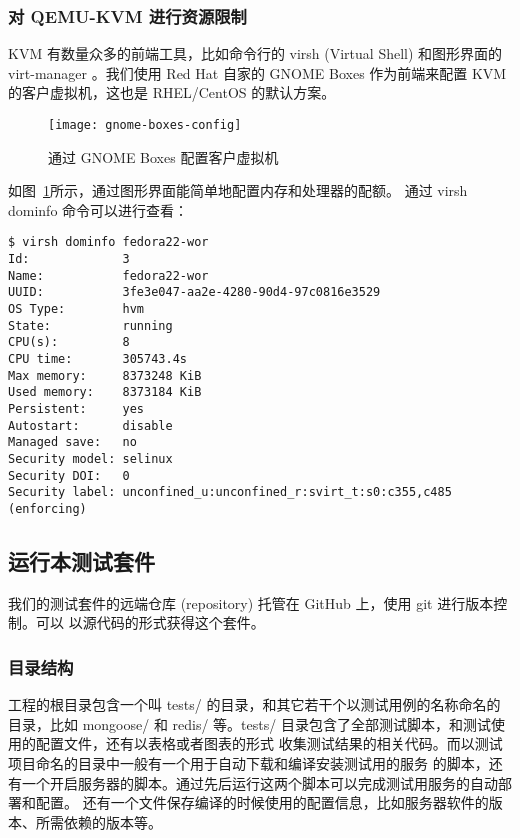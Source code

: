 \subsubsection{对 QEMU-KVM 进行资源限制}

KVM 有数量众多的前端工具，比如命令行的 virsh (Virtual Shell) 和图形界面的 virt-manager
。我们使用 Red Hat 自家的 GNOME Boxes 作为前端来配置 KVM 的客户虚拟机，这也是 RHEL/CentOS
的默认方案。

\begin{figure}[t]
    \centering
    \texttt{[image: gnome-boxes-config]}
    \caption{通过 GNOME Boxes 配置客户虚拟机}
    \label{fig:gnome-boxes-config}
\end{figure}

如图~\ref{fig:gnome-boxes-config}所示，通过图形界面能简单地配置内存和处理器的配额。
通过 virsh dominfo 命令可以进行查看：

\begin{lstlisting}
$ virsh dominfo fedora22-wor
Id:             3
Name:           fedora22-wor
UUID:           3fe3e047-aa2e-4280-90d4-97c0816e3529
OS Type:        hvm
State:          running
CPU(s):         8
CPU time:       305743.4s
Max memory:     8373248 KiB
Used memory:    8373184 KiB
Persistent:     yes
Autostart:      disable
Managed save:   no
Security model: selinux
Security DOI:   0
Security label: unconfined_u:unconfined_r:svirt_t:s0:c355,c485 (enforcing)
\end{lstlisting}

\subsection{运行本测试套件}

我们的测试套件的远端仓库 (repository) 托管在 GitHub 上，使用 git 进行版本控制。可以
以源代码的形式获得这个套件。

\subsubsection{目录结构}

工程的根目录包含一个叫 tests/ 的目录，和其它若干个以测试用例的名称命名的目录，比如 mongoose/
和 redis/ 等。tests/ 目录包含了全部测试脚本，和测试使用的配置文件，还有以表格或者图表的形式
收集测试结果的相关代码。而以测试项目命名的目录中一般有一个用于自动下载和编译安装测试用的服务
的脚本，还有一个开启服务器的脚本。通过先后运行这两个脚本可以完成测试用服务的自动部署和配置。
还有一个文件保存编译的时候使用的配置信息，比如服务器软件的版本、所需依赖的版本等。

